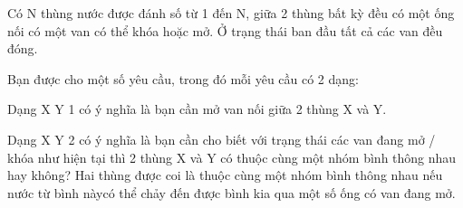 Có N thùng nước được đánh số từ 1 đến N, giữa 2 thùng bất kỳ đều có một ống nối có một van có thể khóa hoặc mở. Ở trạng thái ban đầu tất cả các van đều đóng.  

   Bạn được cho một số yêu cầu, trong đó mỗi yêu cầu có 2 dạng:  

   Dạng X Y 1 có ý nghĩa là bạn cần mở van nối giữa 2 thùng X và Y.  

   Dạng X Y 2 có ý nghĩa là bạn cần cho biết với trạng thái các van đang mở / khóa như hiện tại thì 2 thùng X và Y có thuộc cùng một nhóm bình thông nhau hay không? Hai thùng được coi là thuộc cùng một nhóm bình thông nhau nếu nước từ bình nàycó thể chảy đến được bình kia qua một số ống có van đang mở.